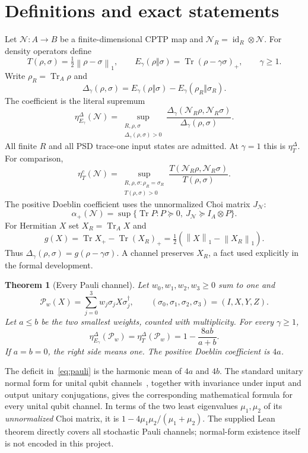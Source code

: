 \documentclass[11pt,a4paper]{article}
\newtheorem{theorem}{Theorem}
\newcommand{\Tr}{\operatorname{Tr}}
\newcommand{\id}{\operatorname{id}}
\newcommand{\cN}{\mathcal N}
\newcommand{\cP}{\mathcal P}
\newcommand{\norm}[1]{\left\lVert#1\right\rVert}
\newcommand{\psd}{\succeq0}
\newcommand{\etal}{\eta^{\Delta}_{E_\gamma}}
\newcommand{\etatr}{\eta^{\Delta}_T}
\newcommand{\etac}{\eta^{c}_T}
\begin{document}
\section{Definitions and exact statements}
Let $\cN:A\to B$ be a finite-dimensional CPTP map and $\cN_R=\id_R\otimes\cN$. For density operators define
\[
 T(\rho,\sigma)=\tfrac12\norm{\rho-\sigma}_1,\qquad
 E_\gamma(\rho\Vert\sigma)=\Tr(\rho-\gamma\sigma)_+,\qquad \gamma\ge1.
\]
Write $\rho_R=\Tr_A\rho$ and
\[
 \Delta_\gamma(\rho,\sigma)=E_\gamma(\rho\Vert\sigma)-E_\gamma(\rho_R\Vert\sigma_R).
\]
The coefficient is the literal supremum
\begin{equation}\label{eq:definition}
 \etal(\cN)=\sup_{\substack{R,\rho,\sigma\\\Delta_\gamma(\rho,\sigma)>0}}
 \frac{\Delta_\gamma(\cN_R\rho,\cN_R\sigma)}{\Delta_\gamma(\rho,\sigma)}.
\end{equation}
All finite $R$ and all PSD trace-one input states are admitted. At $\gamma=1$ this is $\etatr$. For comparison,
\[
 \etac(\cN)=\sup_{\substack{R,\rho,\sigma:\rho_R=\sigma_R\\T(\rho,\sigma)>0}}
 \frac{T(\cN_R\rho,\cN_R\sigma)}{T(\rho,\sigma)}.
\]
The positive Doeblin coefficient uses the unnormalized Choi matrix $J_{\cN}$:
\[
 \alpha_+(\cN)=\sup\{\Tr P:P\psd,\ J_{\cN}\succeq I_A\otimes P\}.
\]
For Hermitian $X$ set $X_R=\Tr_A X$ and
\begin{equation}\label{eq:gap}
 g(X)=\Tr X_+-\Tr(X_R)_+=\tfrac12(\norm X_1-\norm{X_R}_1).
\end{equation}
Thus $\Delta_\gamma(\rho,\sigma)=g(\rho-\gamma\sigma)$. A channel preserves $X_R$, a fact used explicitly in the formal development.

\begin{theorem}[Every Pauli channel]\label{thm:pauli}
Let $w_0,w_1,w_2,w_3\ge0$ sum to one and
\[
 \cP_w(X)=\sum_{j=0}^3 w_j\sigma_jX\sigma_j^\dagger,
 \qquad (\sigma_0,\sigma_1,\sigma_2,\sigma_3)=(I,X,Y,Z).
\]
Let $a\le b$ be the two smallest weights, counted with multiplicity. For every $\gamma\ge1$,
\begin{equation}\label{eq:pauli}
 \etal(\cP_w)=\etatr(\cP_w)=1-\frac{8ab}{a+b}.
\end{equation}
If $a=b=0$, the right side means one. The positive Doeblin coefficient is $4a$.
\end{theorem}

The deficit in~\eqref{eq:pauli} is the harmonic mean of $4a$ and $4b$. The standard unitary normal form for unital qubit channels~\cite[Theorem 2.2]{ChoiLi}, together with invariance under input and output unitary conjugations, gives the corresponding mathematical formula for every unital qubit channel. In terms of the two least eigenvalues $\mu_1,\mu_2$ of its \emph{unnormalized} Choi matrix, it is $1-4\mu_1\mu_2/(\mu_1+\mu_2)$. The supplied Lean theorem directly covers all stochastic Pauli channels; normal-form existence itself is not encoded in this project.
\end{document}
